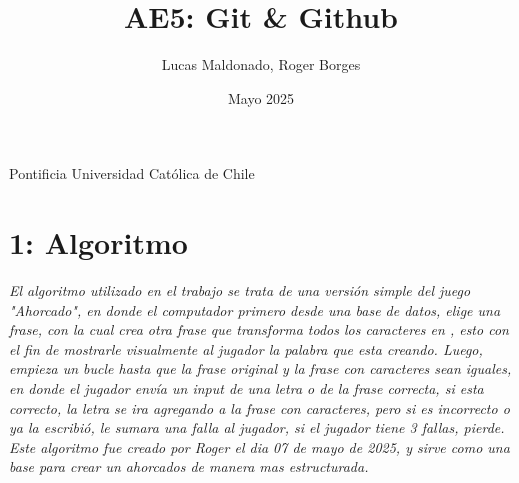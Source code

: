 \documentclass{article}
\title{AE5: Git \& Github}
\author{Lucas Maldonado, Roger Borges}
\date{Mayo 2025}
\begin{document}
\maketitle
\begin{center}
Pontificia Universidad Católica de Chile
\end{center}


\section{1: Algoritmo}

\textit{El algoritmo utilizado en el trabajo se trata de una versión simple del juego "Ahorcado", en donde  el computador primero desde una base de datos, elige una frase, con la cual crea otra frase que transforma todos los caracteres en , esto con el fin de mostrarle visualmente al jugador la palabra que esta creando. Luego, empieza un bucle hasta que la frase original y la frase con caracteres sean iguales, en donde el jugador envía un input de una letra o de la frase correcta, si esta correcto, la letra se ira agregando a la frase con caracteres, pero si es incorrecto o ya la escribió, le sumara una falla al jugador, si el jugador tiene 3 fallas, pierde. Este algoritmo fue creado por Roger el dia 07 de mayo de 2025, y sirve como una base para crear un ahorcados de manera mas estructurada.}
\end{document}
